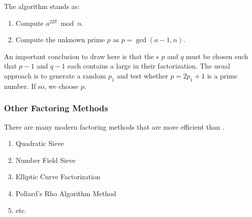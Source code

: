 The algorithm stands as:
\begin{enumerate}[noitemsep]
\item Compute $a^{2B!} \bmod n$.
\item Compute the unknown prime $p$ as $p = \gcd(a-1, n)$.
\end{enumerate}

An important conclusion to draw here is that the s $p$ and $q$ must be chosen such that $p-1$ and $q-1$ each contains a large  in their factorization.
The usual approach is to generate a random  $p_{1}$ and test whether $p = 2p_{1} + 1$ is a prime number.
If so, we choose $p$.

\subsubsection{Other Factoring Methods}\label{subsubsec:Other_Factoring_Methods}
There are many modern factoring methods that are more efficient than .
\begin{enumerate}[noitemsep]
\item Quadratic Sieve
\item Number Field Sieve
\item Elliptic Curve Factorization
\item Pollard's Rho Algorithm Method
\item etc.
\end{enumerate}

